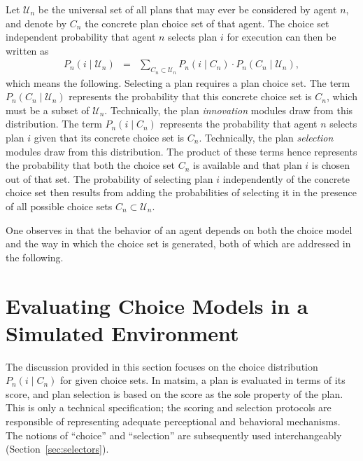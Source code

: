 Let $\mathcal{U}_n$ be the universal set of all plans that may ever be considered
by agent $n$, and denote by $C_{n}$ the concrete plan choice set
of that agent. The choice set independent probability that agent $n$
selects plan $i$ for execution can then be written as
\begin{eqnarray}
P_{n}(i\mid \mathcal{U}_n) & = & \sum_{C_{n}\subset \mathcal{U}_n}P_{n}(i\mid C_{n})\cdot P_{n}(C_{n}\mid \mathcal{U}_n),
\label{eq:unconditional-choice-proba}
\end{eqnarray}
which means the following. Selecting a plan requires a plan choice
set. The term $P_{n}(C_{n}\mid \mathcal{U}_n)$ represents the probability that
this concrete choice set is $C_{n}$, which must be a subset of $\mathcal{U}_n$.
Technically, the plan \emph{innovation} modules draw from this distribution.
The term $P_{n}(i\mid C_{n})$ represents the probability that agent
$n$ selects plan $i$ given that its concrete choice set is $C_{n}$.
Technically, the plan \emph{selection} modules draw from this distribution.
The product of these terms hence represents the probability that both
the choice set $C_{n}$ is available and that plan $i$ is chosen out
of that set. The probability of selecting plan $i$ independently
of the concrete choice set then results from adding the probabilities
of selecting it in the presence of all possible choice sets $C_{n}\subset \mathcal{U}_n$.

One observes in  that the
behavior of an agent depends on both the choice model and the way
in which the choice set is generated, both of which are addressed
in the following.

\section{\label{sec:Evaluating-choice-models}Evaluating Choice Models in
a Simulated Environment}

The discussion provided in this section focuses on the choice distribution
$P_{n}(i\mid C_{n})$ for given choice sets. In \gls{matsim}, a plan is
evaluated in terms of its score, and plan selection is based on the
score as the sole property of the plan. This is only a technical specification;
the scoring and selection protocols are responsible of representing
adequate perceptional and behavioral mechanisms. The notions of {}``choice''
and {}``selection'' are subsequently used interchangeably (\cf Section~\ref{sec:selectors}).

